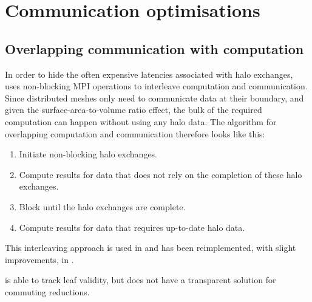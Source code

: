 \documentclass[thesis]{subfiles}
\begin{document}


\section{Communication optimisations}

\subsection{Overlapping communication with computation}

In order to hide the often expensive latencies associated with halo exchanges,  uses non-blocking MPI operations to interleave computation and communication.
Since distributed meshes only need to communicate data at their boundary, and given the surface-area-to-volume ratio effect, the bulk of the required computation can happen without using any halo data.
The algorithm for overlapping computation and communication therefore looks like this:

\begin{enumerate}
  \item Initiate non-blocking halo exchanges.
  \item Compute results for data that does not rely on the completion of these halo exchanges.
  \item Block until the halo exchanges are complete.
  \item Compute results for data that requires up-to-date halo data.
\end{enumerate}

This interleaving approach is used in  and has been reimplemented, with slight improvements, in .

 is able to track leaf validity, but does not have a transparent solution for commuting reductions.

\end{document}
